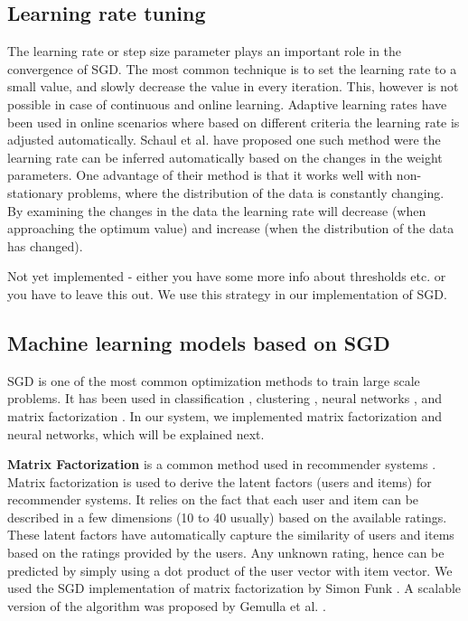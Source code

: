 \documentclass{sig-alternate-05-2015}
\begin{document}
\subsection{Learning rate tuning} \label{learning-rate}
The learning rate or step size parameter plays an important role in the convergence of SGD.
The most common technique is to set the learning rate to a small value, and slowly decrease the value in every iteration. 
This, however is not possible in case of continuous and online learning. 
Adaptive learning rates have been used in online scenarios where based on different criteria the learning rate is adjusted automatically.
Schaul et al. \cite{schaul2013no} have proposed one such method were the learning rate can be inferred automatically based on the changes in the weight parameters. 
One advantage of their method is that it works well with non-stationary problems, where the distribution of the data is constantly changing. 
By examining the changes in the data the learning rate will decrease (when approaching the optimum value) and increase (when the distribution of the data has changed).
 
{\color{red}Not yet implemented - either you have some more info about thresholds etc. or you have to leave this out.}
We use this strategy in our implementation of SGD. 


\subsection{Machine learning models based on SGD}
SGD is one of the most common optimization methods to train large scale problems. 
It has been used in classification \cite{zhang2004solving}, clustering \cite{bottou1995convergence}, neural networks \cite{dean2012large}, and matrix factorization \cite{funk2006netflix}.
In our system, we implemented matrix factorization and neural networks, which will be explained next. 

\textbf{Matrix Factorization} is a common method used in recommender systems \cite{koren2009matrix}. 
Matrix factorization is used to derive the latent factors (users and items) for recommender systems.
It relies on the fact that each user and item can be described in a few dimensions (10 to 40 usually) based on the available ratings.
These latent factors have automatically capture the similarity of users and items based on the ratings provided by the users.
Any unknown rating, hence can be predicted by simply using a dot product of the user vector with item vector.
We used the SGD implementation of matrix factorization by Simon Funk \cite{funk2006netflix}. 
A scalable version of the algorithm was proposed by Gemulla et al. \cite{gemulla2011large}.
\end{document}
